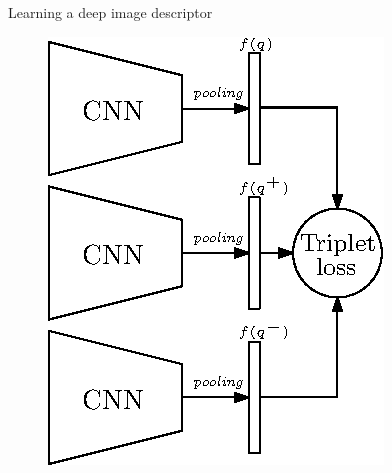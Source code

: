 \begin{frame}{Learning a deep image descriptor}
\begin{minipage}{0.49\linewidth}
\begin{minipage}[c]{0.26\linewidth}
			\vspace{0.1cm}
		\end{minipage}
		\begin{minipage}{0.7\linewidth}
			\vfill
			\begin{figure}
				\centering
				\includegraphics[width=\linewidth]{vect/triplet_loss.eps}			

\end{figure}
\end{minipage}
\end{minipage}
\end{frame}
